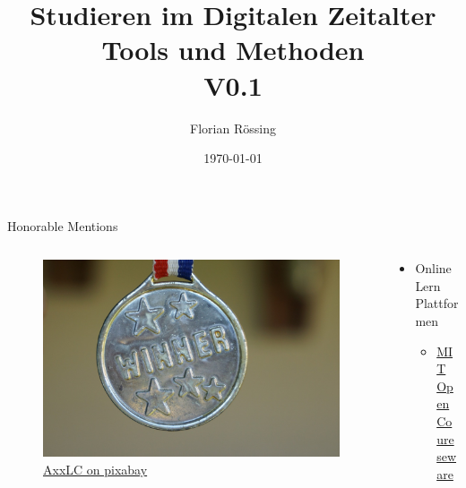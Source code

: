 \documentclass[aspectratio=169,shownotes]{beamer}
\title{Studieren im Digitalen Zeitalter \\\small Tools und Methoden\\ V0.1}
\author{Florian Rössing}
\date{\today}
\begin{document}
\maketitle











\begin{frame}{Honorable Mentions}
    \begin{columns}[t]
        \begin{column}{0.4\textwidth}
            \vspace{-2em} 
            \begin{figure}
                \begin{flushleft}
                    \includegraphics[height=0.8\textheight,trim={4cm 0 17cm 0},clip]{graphics/winner-1548239_1280.jpg}
                    \caption*{\href{https://pixabay.com/photos/winner-medal-gold-award-success-1548239/}{AxxLC on pixabay}}    
                \end{flushleft}                
            \end{figure}            
        \end{column}
        \begin{column}{0.6\textwidth}
            \begin{itemize}
                \item Online Lern Plattformen
                \begin{itemize}
                    \item \href{https://ocw.mit.edu/}{MIT Open Coureseware}

\end{itemize}
\end{itemize}
\end{column}
\end{columns}
\end{frame}
\end{document}

